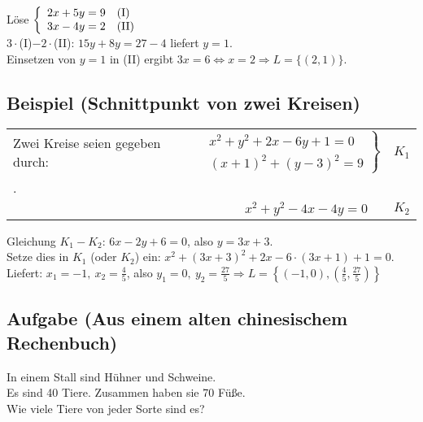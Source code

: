 	Löse  $\left\{  \begin{array}{ll}
                  			2x+5y=9 & \textnormal{(I)}\\
                  			3x-4y=2 & \textnormal{(II)}
                			\end{array}
                \right.$\\
                
    $3\cdot$(I)$-2\cdot$(II):  $15y+8y=27-4$ liefert $y=1$.\\
    Einsetzen von $y=1$ in (II) ergibt $3x=6 \Leftrightarrow x=2 \Rightarrow L=\{(2,1)\}$.
    
    
\subsection[Schnittpunkt von zwei Kreisen]{Beispiel (Schnittpunkt von zwei Kreisen)}
	
	
	\begin{tabular}{@{}lrl}
	
	Zwei Kreise seien gegeben durch: 	& $\left.  \begin{array}{l}
                  								 		x^2+y^2+2x-6y+1=0 \\
                  										(x+1)^2+(y-3)^2=9
                									\end{array}
             						 	  \right\}$ & $K_1$\\.

										&&\\
										&  $x^2+y^2-4x-4y=0 \quad$ &$K_2$
 
	\end{tabular}	\newline
	
	Gleichung $K_1 - K_2$:  $6x-2y+6=0$, also $y=3x+3$.\\
	Setze dies in $K_1$ (oder $K_2$) ein: $x^2+(3x+3)^2+2x-6\cdot (3x+1)+1=0$.\\
	Liefert: $x_1=-1,\ x_2=\frac{4}{5}$, also $y_1=0,\ y_2=\frac{27}{5} \Rightarrow
	L=\left\{(-1,0), \left(\frac{4}{5},\frac{27}{5} \right) \right\}$


\subsection[Aufgabe]{Aufgabe (Aus einem alten chinesischem Rechenbuch)}

	In einem Stall sind Hühner und Schweine.\\
	 Es sind 40 Tiere. Zusammen haben sie 70 Füße.\\ \newline 
	Wie viele Tiere von jeder Sorte sind es?
	